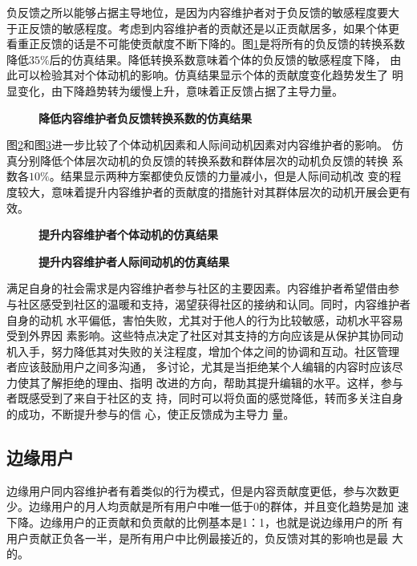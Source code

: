负反馈之所以能够占据主导地位，是因为内容维护者对于负反馈的敏感程度要大
于正反馈的敏感程度。考虑到内容维护者的贡献还是以正贡献居多，如果个体更
看重正反馈的话是不可能使贡献度不断下降的。图\ref{fig:improveX}是将所有的负反馈的转换系数
降低$35\%$后的仿真结果。降低转换系数意味着个体的负反馈的敏感程度下降，
由此可以检验其对个体动机的影响。仿真结果显示个体的贡献度变化趋势发生了
明显变化，由下降趋势转为缓慢上升，意味着正反馈占据了主导力量。

\begin{figure}[!htb]
  \centering
   
  \caption{\small{\textbf{降低内容维护者负反馈转换系数的仿真结果}}}
  \label{fig:improveX}
\end{figure}

图\ref{fig:improve7}和图\ref{fig:improve8}进一步比较了个体动机因素和人际间动机因素对内容维护者的影响。
仿真分别降低个体层次动机的负反馈的转换系数和群体层次的动机负反馈的转换
系数各$10\%$。结果显示两种方案都使负反馈的力量减小，但是人际间动机改
变的程度较大，意味着提升内容维护者的贡献度的措施针对其群体层次的动机开展会更有效。

\begin{figure}[!htb]
  \centering
  
  \caption{\small{\textbf{提升内容维护者个体动机的仿真结果}}}
  \label{fig:improve7}
\end{figure}

\begin{figure}[!htb]
  \centering
  
  \caption{\small{\textbf{提升内容维护者人际间动机的仿真结果}}}
  \label{fig:improve8}
\end{figure}
满足自身的社会需求是内容维护者参与社区的主要因素。内容维护者希望借由参
与社区感受到社区的温暖和支持，渴望获得社区的接纳和认同。同时，内容维护者自身的动机
水平偏低，害怕失败，尤其对于他人的行为比较敏感，动机水平容易受到外界因
素影响。这些特点决定了社区对其支持的方向应该是从保护其协同动
机入手，努力降低其对失败的关注程度，增加个体之间的协调和互动。社区管理
者应该鼓励用户之间多沟通，
多讨论，尤其是当拒绝某个人编辑的内容时应该尽力使其了解拒绝的理由、指明
改进的方向，帮助其提升编辑的水平。这样，参与者既感受到了来自于社区的支
持，同时可以将负面的感觉降低，转而多关注自身的成功，不断提升参与的信
心，使正反馈成为主导力
量。

\subsection{边缘用户}
边缘用户同内容维护者有着类似的行为模式，但是内容贡献度更低，参与次数更
少。边缘用户的月人均贡献是所有用户中唯一低于0的群体，并且变化趋势是加
速下降。边缘用户的正贡献和负贡献的比例基本是1：1，也就是说边缘用户的所
有用户贡献正负各一半，是所有用户中比例最接近的，负反馈对其的影响也是最
大的。

